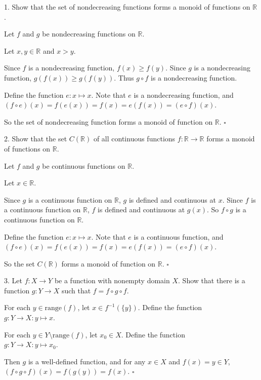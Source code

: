 \documentclass{article}
\begin{document}
1. Show that the set of nondecreasing functions forms a monoid of functions on $\mathbb{R}$.

Let $f$ and $g$ be nondecreasing functions on $\mathbb{R}$. 

Let $x, y \in\mathbb{R}$ and $x>y$.

Since $f$ is a nondecreasing function, $f(x) \geq f(y)$. Since $g$ is a nondecreasing function, $g(f(x)) \geq g(f(y))$. Thus $g \circ f$ is a nondecreasing function. 

Define the function $e: x \mapsto x$. Note that $e$ is a nondecreasing function, and $(f \circ e)(x) = f(e(x)) = f(x) = e(f(x)) = (e\circ f)(x)$.

So the set of nondecreasing function forms a monoid of function on $\mathbb{R}$. $\square$

2. Show that the set $C(\mathbb{R})$ of all continuous functions $f: \mathbb{R} \rightarrow \mathbb{R}$ forms a monoid of functions on $\mathbb{R}$. 

Let $f$ and $g$ be continuous functions on $\mathbb{R}$. 

Let $x \in \mathbb{R}$.

Since $g$ is a continuous function on $\mathbb{R}$, $g$ is defined and continuous at $x$. Since $f$ is a continuous function on $\mathbb{R}$, $f$ is defined and continuous at $g(x)$. So $f\circ g$ is a continuous function on $\mathbb{R}$.

Define the function $e: x \mapsto x$. Note that $e$ is a continuous function, and $(f \circ e)(x) = f(e(x)) = f(x) = e(f(x)) = (e\circ f)(x)$.

So the set $C(\mathbb{R})$ forms a monoid of function on $\mathbb{R}$. $\square$

3. Let $f:X \rightarrow Y$ be a function with nonempty domain $X$. Show that there is a function $g: Y \rightarrow X$ such that $f = f\circ g \circ f$.

For each $y \in \text{range}(f)$, let $x \in f^{-1}(\{y\})$. Define the function \\$g: Y \rightarrow X: y \mapsto x$.

For each $y \in Y \setminus \text{range}(f)$, let $x_0 \in X$. Define the function \\$g: Y \rightarrow X: y \mapsto x_0$.

Then $g$ is a well-defined function, and for any $x \in X$ and $f(x) = y \in Y$, \\$(f \circ g \circ f)(x) = f(g(y)) = f(x)$. $\square$
\end{document}
